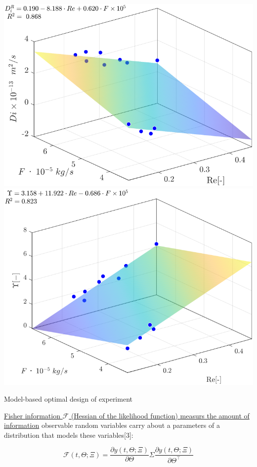 \documentclass[a0,portrait]{a0poster}
\begin{document}
\begin{multicols}{2}
\begin{tcolorbox}[width=\linewidth, boxrule=0mm, sharp corners=all, colback=white]
\begin{center}\vspace{0.5cm}
	\includegraphics[width=0.49\linewidth]{Di_Re_F_1.png}
	\includegraphics[width=0.49\linewidth]{Gamma_Re_F_1.png}
\end{center}%

\end{tcolorbox}

\begin{tcolorbox}[width=\linewidth, boxrule=0mm, sharp corners=all, colback=white]
\begin{tcolorbox}[width=\linewidth, boxrule=0mm, sharp corners=all, colback=white]
	{\LARGE Model-based optimal design of experiment\\}
\end{tcolorbox}

\underline{Fisher information $\mathcal{F}$ (Hessian of the likelihood function) measurs the amount of information} observable random variables carry about a parameters of a distribution that models these variables[3]:

\begin{equation*}
	\mathcal{F}(t,\Theta; \Xi) = \frac{\partial y(t, \Theta; \Xi)}{\partial \Theta} \Sigma \frac{\partial y(t, \Theta; \Xi)}{\partial \Theta^\top}
\end{equation*}


\end{tcolorbox}
\end{multicols}
\end{document}
